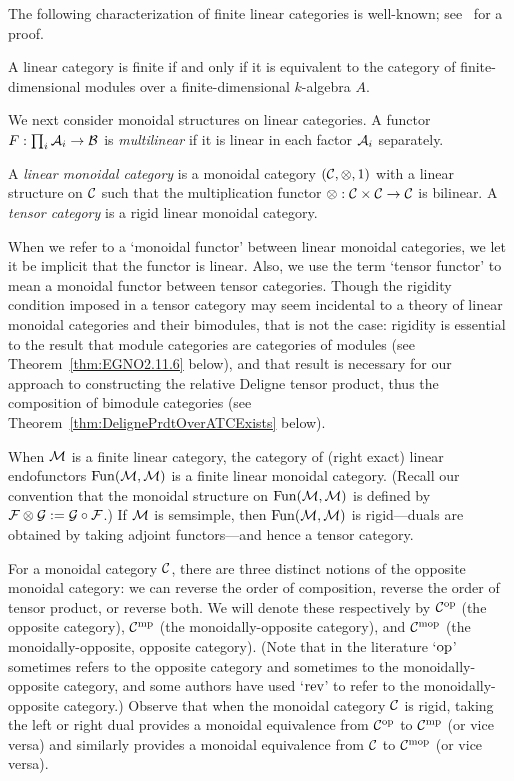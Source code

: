 \documentclass{amsart}
\begin{document}
The following characterization of finite linear categories is well-known; see~\cite{BTP} for a proof.
\begin{proposition} \label{prop:catismod}
A linear category is finite if and only if it is equivalent to the category of finite-dimensional modules over a finite-dimensional $k$-algebra $A$.
\end{proposition}

We next consider monoidal structures on linear categories.  A functor $F: \prod_i \mathcal A_i \to \mathcal B$ is \emph{multilinear} if it is linear in each factor $\mathcal A_i$ separately.

\begin{definition}
A \emph{linear monoidal category} is a monoidal category $(\mathcal C, \otimes, 1)$ with a linear structure on $\mathcal C$ such that the multiplication functor $\otimes: \mathcal C \times \mathcal C \rightarrow \mathcal C$ is bilinear.  A \emph{tensor category} is a rigid linear monoidal category.
\end{definition}
\nid When we refer to a `monoidal functor' between linear monoidal categories, we let it be implicit that the functor is linear.  Also, we use the term `tensor functor' to mean a monoidal functor between tensor categories.  Though the rigidity condition imposed in a tensor category may seem incidental to a theory of linear monoidal categories and their bimodules, that is not the case: rigidity is essential to the result that module categories are categories of modules (see Theorem~\ref{thm:EGNO2.11.6} below), and that result is necessary for our approach to constructing the relative Deligne tensor product, thus the composition of bimodule categories (see Theorem~\ref{thm:DelignePrdtOverATCExists} below).

\begin{example}
When $\mathcal M$ is a finite linear category, the category of (right exact) linear endofunctors $\operatorname{Fun}(\mathcal M,\mathcal M)$ is a finite linear monoidal category.  (Recall our convention that the monoidal structure on $\operatorname{Fun}(\mathcal M,\mathcal M)$ is defined by $\mathcal F \otimes \mathcal G := \mathcal G \circ \mathcal F$.)  If $\mathcal M$ is semsimple, then $\operatorname{Fun}(\mathcal M,\mathcal M)$ is rigid---duals are obtained by taking adjoint functors---and hence a tensor category.
\end{example} %

For a monoidal category $\mathcal C$, there are three distinct notions of the opposite monoidal category: we can reverse the order of composition, reverse the order of tensor product, or reverse both.  We will denote these respectively by $\mathcal C^{\mathrm{op}}$ (the opposite category), $\mathcal C^{\mathrm{mp}}$ (the monoidally-opposite category), and $\mathcal C^{\mathrm{mop}}$ (the monoidally-opposite, opposite category).  (Note that in the literature `$\mathrm{op}$' sometimes refers to the opposite category and sometimes to the monoidally-opposite category, and some authors have used `$\mathrm{rev}$' to refer to the monoidally-opposite category.)  Observe that when the monoidal category $\mathcal C$ is rigid, taking the left or right dual provides a monoidal equivalence from $\mathcal C^{\mathrm{op}}$ to $\mathcal C^{\mathrm{mp}}$ (or vice versa) and similarly provides a monoidal equivalence from $\mathcal C$ to $\mathcal C^{\mathrm{mop}}$ (or vice versa).
\end{document}
